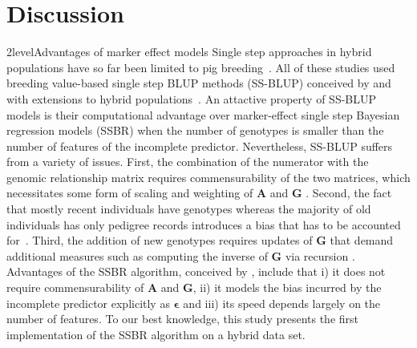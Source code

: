 \documentclass[12pt,titlepage]{article}
\begin{document}
\section*{Discussion}
\Genetics2level{Advantages of marker effect models}
Single step approaches in hybrid populations have so far been limited to pig
breeding~\cite{Xiang2015,Xiang2016,Tusell2016}.
All of these studies used breeding value-based single step BLUP methods
(SS-BLUP) conceived by  and  with
extensions to hybrid populations~\cite{Christensen2014,Christensen2015}.
An attactive property of SS-BLUP models is their computational advantage over 
marker-effect single step Bayesian regression models (SSBR) when the number of 
genotypes is smaller than the number of features of the incomplete predictor.
Nevertheless, SS-BLUP suffers from a variety of issues.
First, the combination of the numerator with the genomic relationship matrix
requires commensurability of the two matrices, which necessitates some form of
scaling and weighting of $\mathbf{A}$ and $\mathbf{G}$
\cite{Christensen2012,Christensen2012a}.
Second, the fact that mostly recent individuals have genotypes whereas the 
majority of old individuals has only pedigree records introduces a bias that 
has to be accounted for~\cite{Vitezica2011,Legarra2015,Garcia-Baccino2017}.
Third, the addition of new genotypes requires updates of $\mathbf{G}$ that
demand additional measures such as computing the inverse of $\mathbf{G}$ via
recursion
\cite{Misztal2014,Misztal2016,Misztal2016a,Fragomeni2015,Masuda2016,Pocrnic2016}.
Advantages of the SSBR algorithm, conceived by , include
that i) it does not require commensurability of $\mathbf{A}$ and $\mathbf{G}$, 
ii) it models the bias incurred by the incomplete predictor explicitly as 
$\mathbf{\epsilon}$ and iii) its speed depends largely on the number of 
features.
To our best knowledge, this study presents the first implementation of the SSBR 
algorithm on a hybrid data set.
\end{document}
